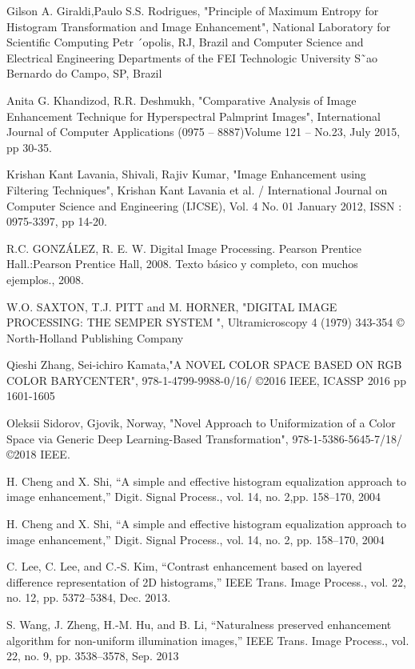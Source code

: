 \begin{thebibliography}{111}
	 Gilson A. Giraldi,Paulo S.S. Rodrigues,  "Principle of Maximum Entropy for 
	Histogram Transformation and Image Enhancement", National Laboratory for Scientific Computing Petr
	´opolis, RJ, Brazil and Computer Science and Electrical Engineering Departments of the FEI 
	Technologic University S˜ao Bernardo do Campo, SP, Brazil
	
	 Anita G. Khandizod, R.R. Deshmukh, "Comparative Analysis of Image Enhancement 
	Technique for Hyperspectral Palmprint Images", International Journal of Computer Applications (0975 
	– 8887)Volume 121 – No.23, July 2015, pp 30-35.
	
	 Krishan Kant Lavania, Shivali, Rajiv Kumar, "Image Enhancement using Filtering 
	Techniques", Krishan Kant Lavania et al. / International Journal on Computer Science and Engineering 
	(IJCSE), Vol. 4 No. 01 January 2012, ISSN : 0975-3397, pp 14-20.
	
	 R.C. GONZÁLEZ, R. E. W. Digital Image Processing. Pearson Prentice Hall.:Pearson 
	Prentice Hall, 2008. Texto básico y completo, con muchos ejemplos., 2008.

	 W.O. SAXTON, T.J. PITT and M. HORNER, "DIGITAL IMAGE PROCESSING: THE SEMPER SYSTEM ", 
	Ultramicroscopy 4 (1979) 343-354 © North-Holland Publishing Company

	 Qieshi Zhang, Sei-ichiro Kamata,"A NOVEL COLOR SPACE BASED ON RGB COLOR BARYCENTER", 
	978-1-4799-9988-0/16/ ©2016 IEEE, ICASSP 2016 pp 1601-1605

	 Oleksii Sidorov, Gjovik, Norway, "Novel Approach to Uniformization of a Color Space
	via Generic Deep Learning-Based Transformation", 978-1-5386-5645-7/18/ ©2018 IEEE.

	H. Cheng and X. Shi, “A simple and effective histogram equalization approach to image 
	enhancement,” Digit. Signal Process., vol. 14, no. 2,pp. 158–170, 2004
	
	 H. Cheng and X. Shi, “A simple and effective histogram equalization approach to image 
	enhancement,” Digit. Signal Process., vol. 14, no. 2, pp. 158–170, 2004
	
	 C. Lee, C. Lee, and C.-S. Kim, “Contrast enhancement based on layered difference 
	representation of 2D histograms,” IEEE Trans. Image Process., vol. 22, no. 12, pp. 5372–5384, Dec. 
	2013.

	 S. Wang, J. Zheng, H.-M. Hu, and B. Li, “Naturalness preserved enhancement algorithm 
	for non-uniform illumination images,” IEEE Trans. Image Process., vol. 22, no. 9, pp. 3538–3578, 
	Sep. 2013
	

\end{thebibliography}
